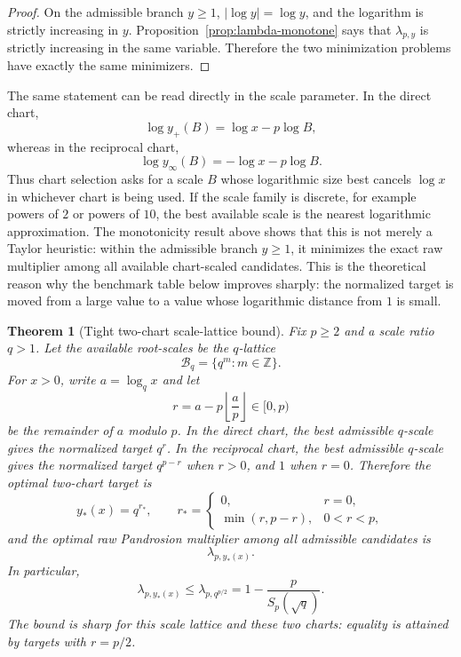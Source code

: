 \documentclass[10pt,a4paper]{article}
\theoremstyle{plain}
\newtheorem{theorem}{Theorem}[section]
\theoremstyle{definition}
\theoremstyle{remark}
\begin{document}
\begin{proof}
On the admissible branch $y\ge1$, $|\log y|=\log y$, and the logarithm is
strictly increasing in $y$.  Proposition~\ref{prop:lambda-monotone} says that
$\lambda_{p,y}$ is strictly increasing in the same variable.  Therefore the two
minimization problems have exactly the same minimizers.
\end{proof}

The same statement can be read directly in the scale parameter.  In the direct
chart,
\[
  \log y_+(B)=\log x-p\log B,
\]
whereas in the reciprocal chart,
\[
  \log y_\infty(B)=-\log x-p\log B.
\]
Thus chart selection asks for a scale $B$ whose logarithmic size best cancels
$\log x$ in whichever chart is being used.  If the scale family is discrete,
for example powers of $2$ or powers of $10$, the best available scale is the
nearest logarithmic approximation.  The monotonicity result above shows that
this is not merely a Taylor heuristic: within the admissible branch $y\ge1$, it
minimizes the exact raw multiplier among all available chart-scaled candidates.
This is the theoretical reason why the benchmark table below improves sharply:
the normalized target is moved from a large value to a value whose logarithmic
distance from $1$ is small.

\begin{theorem}[Tight two-chart scale-lattice bound]
\label{thm:q-lattice-two-chart}
Fix $p\ge2$ and a scale ratio $q>1$.  Let the available root-scales be the
$q$-lattice
\[
  \mathcal B_q=\{q^m:m\in\mathbb Z\}.
\]
For $x>0$, write $a=\log_q x$ and let
\[
  r=a-p\left\lfloor \frac{a}{p}\right\rfloor\in[0,p)
\]
be the remainder of $a$ modulo $p$.  In the direct chart, the best admissible
$q$-scale gives the normalized target $q^r$.  In the reciprocal chart, the best
admissible $q$-scale gives the normalized target $q^{p-r}$ when $r>0$, and $1$
when $r=0$.  Therefore the optimal two-chart target is
\[
  y_*(x)=q^{r_*},
  \qquad
  r_*=
  \begin{cases}
    0, & r=0,\\
    \min(r,p-r), & 0<r<p,
  \end{cases}
\]
and the optimal raw Pandrosion multiplier among all admissible candidates is
\[
  \lambda_{p,y_*(x)}.
\]
In particular,
\begin{equation}
  \lambda_{p,y_*(x)}
  \le \lambda_{p,q^{p/2}}
  =1-\frac{p}{S_p(\sqrt q)}.
  \label{eq:q-lattice-two-chart-bound}
\end{equation}
The bound is sharp for this scale lattice and these two charts: equality is
attained by targets with $r=p/2$.
\end{theorem}
\end{document}

